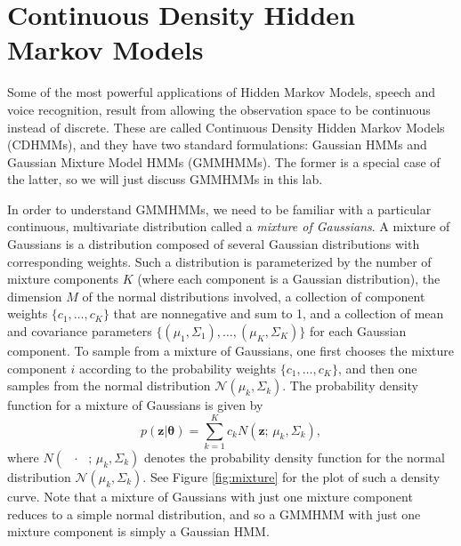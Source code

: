 
\section*{Continuous Density Hidden Markov Models}
Some of the most powerful applications of Hidden Markov Models, speech and voice recognition, result from allowing the observation space to be continuous instead of discrete.
These are called Continuous Density Hidden Markov Models (CDHMMs), and they have two standard formulations: Gaussian HMMs and Gaussian Mixture Model HMMs (GMMHMMs).
The former is a special case of the latter, so we will just discuss GMMHMMs in this lab.

In order to understand GMMHMMs, we need to be familiar with a particular continuous, multivariate distribution called a \emph{mixture of Gaussians}.
A mixture of Gaussians is a distribution composed of several Gaussian distributions with corresponding weights.
Such a distribution is parameterized by the number of mixture components $K$ (where each component is a Gaussian distribution), the dimension $M$ of the normal distributions involved, a collection of component weights
$\{c_1, \ldots, c_K\}$ that are nonnegative and sum to 1, and a collection of mean and covariance parameters $\{(\mu_1,\Sigma_1), \ldots, (\mu_K,\Sigma_K)\}$ for each Gaussian
component. To sample from a mixture of Gaussians, one first chooses the mixture component $i$ according to the probability weights $\{c_1,\ldots,c_K\}$, and then one
samples from the normal distribution $\mathcal{N}(\mu_k, \Sigma_k)$. The probability density function for a mixture of Gaussians is given by
\[
p(\mathbf{z}|\mathbf{\theta}) = \sum_{k=1}^K c_kN(\mathbf{z};\,\mu_k,\Sigma_k),
\]
where $N(\text{ } \cdot \text{ };\,\mu_k,\Sigma_k)$ denotes the probability density function for the normal distribution $\mathcal{N}(\mu_k, \Sigma_k)$.
See Figure \ref{fig:mixture} for the plot of such a density curve.
Note that a mixture of Gaussians with just one mixture component reduces to a simple normal distribution, and so a GMMHMM with just one mixture component
is simply a Gaussian HMM.

